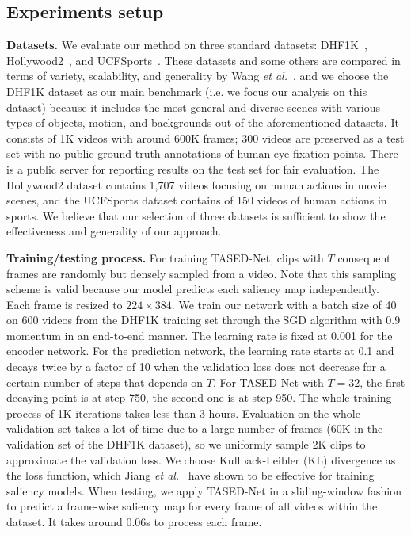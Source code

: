 \documentclass[10pt,twocolumn,letterpaper]{article}
\newcommand{\modelname}{TASED-Net}
\begin{document}
\subsection{Experiments setup} \label{subsec:training}
\textbf{Datasets.} We evaluate our method on three standard datasets: DHF1K~\cite{wang2018revisiting}, Hollywood2~\cite{marszalek2009actions, mathe2015actions}, and UCFSports~\cite{mathe2015actions, rodriguez2008action, soomro2014action}. These datasets and some others are compared in terms of variety, scalability, and generality by Wang \textit{et al.}~\cite{wang2018revisiting}, and we choose the DHF1K dataset as our main benchmark (i.e. we focus our analysis on this dataset) because it includes the most general and diverse scenes with various types of objects, motion, and backgrounds out of the aforementioned datasets. It consists of 1K videos with around 600K frames; 300 videos are preserved as a test set with no public ground-truth annotations of human eye fixation points. There is a public server for reporting results on the test set for fair evaluation. The Hollywood2 dataset contains 1,707 videos focusing on human actions in movie scenes, and the UCFSports dataset contains of 150 videos of human actions in sports. We believe that our selection of three datasets is sufficient to show the effectiveness and generality of our approach.

\textbf{Training/testing process.} For training \modelname{}, clips with $T$ consequent frames are randomly but densely sampled from a video. Note that this sampling scheme is valid because our model predicts each saliency map independently. Each frame is resized to $224 \times 384$. We train our network with a batch size of 40 on 600 videos from the DHF1K training set through the SGD algorithm with 0.9 momentum in an end-to-end manner. The learning rate is fixed at 0.001 for the encoder network. For the prediction network, the learning rate starts at 0.1 and decays twice by a factor of 10 when the validation loss does not decrease for a certain number of steps that depends on $T$. For \modelname{} with $T=32$, the first decaying point is at step 750, the second one is at step 950. The whole training process of 1K iterations takes less than 3 hours. Evaluation on the whole validation set takes a lot of time due to a large number of frames (60K in the validation set of the DHF1K dataset), so we uniformly sample 2K clips to approximate the validation loss. We choose Kullback-Leibler (KL) divergence as the loss function, which Jiang \textit{et al.}~\cite{jiang2015salicon} have shown to be effective for training saliency models. When testing, we apply \modelname{} in a sliding-window fashion to predict a frame-wise saliency map for every frame of all videos within the dataset. It takes around 0.06s to process each frame.
\end{document}
